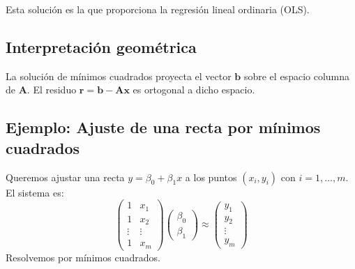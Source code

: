 \documentclass[12pt,a4paper,openany,oneside]{book}
\begin{document}
Esta solución es la que proporciona la regresión lineal ordinaria (OLS).

\subsection{Interpretación geométrica}
La solución de mínimos cuadrados proyecta el vector $\mathbf{b}$ sobre el espacio columna de $\mathbf{A}$. El residuo $\mathbf{r} = \mathbf{b} - \mathbf{A}\mathbf{x}$ es ortogonal a dicho espacio.

\begin{center}
\end{center}

\subsection{Ejemplo: Ajuste de una recta por mínimos cuadrados}
Queremos ajustar una recta $y = \beta_0 + \beta_1 x$ a los puntos $(x_i, y_i)$ con $i=1,\dots,m$. El sistema es:
\[
\begin{pmatrix}
1 & x_1 \\
1 & x_2 \\
\vdots & \vdots \\
1 & x_m
\end{pmatrix}
\begin{pmatrix}
\beta_0 \\ \beta_1
\end{pmatrix}
\approx
\begin{pmatrix}
y_1 \\ y_2 \\ \vdots \\ y_m
\end{pmatrix}
\]
Resolvemos por mínimos cuadrados.
\end{document}
